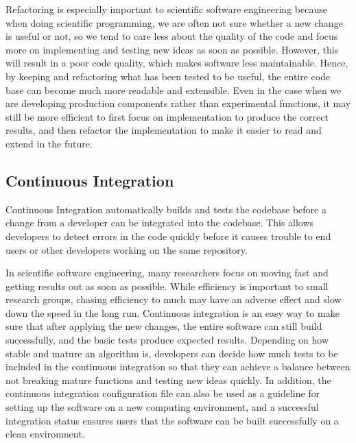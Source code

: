 Refactoring is especially important to scientific software engineering because when doing scientific programming, we are often not sure whether a new change is useful or not, 
so we tend to care less about the quality of the code and focus more on implementing and testing new ideas as soon as possible.
However, this will result in a poor code quality, which makes software less maintainable.
Hence, by keeping and refactoring what has been tested to be useful, the entire code base can become much more readable and extensible.
Even in the case when we are developing production components rather than experimental functions, it may still be more efficient to first focus on implementation to produce the correct results, and then refactor the implementation to make it easier to read and extend in the future.

\subsection{Continuous Integration}
Continuous Integration automatically builds and tests the codebase before a change from a developer can be integrated into the codebase.
This allows developers to detect errors in the code quickly before it causes trouble to end users or other developers working on the same repository.

In scientific software engineering, many researchers focus on moving fast and getting results out as soon as possible.
While efficiency is important to small research groups, chasing efficiency to much may have an adverse effect and slow down the speed in the long run.
Continuous integration is an easy way to make sure that after applying the new changes, the entire software can still build successfully, and the basic tests produce expected results.
Depending on how stable and mature an algorithm is, developers can decide how much tests to be included in the continuous integration so that they can achieve a balance between not breaking mature functions and testing new ideas quickly.
In addition, the continuous integration configuration file can also be used as a guideline for setting up the software on a new computing environment, and a successful integration status ensures users that the software can be built successfully on a clean environment.